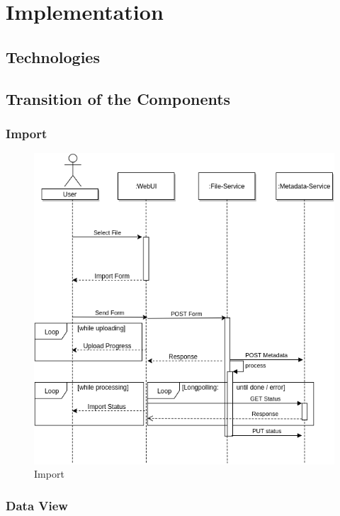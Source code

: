 
\chapter{Implementation}



\section{Technologies}


\section{Transition of the Components}

\subsection{Import}
\begin{figure}[H]
	\centering\includegraphics[width=.75\textwidth]{res/Import}
	\caption{Import}
	\label{fig:import}
\end{figure}

\subsection{Data View}

